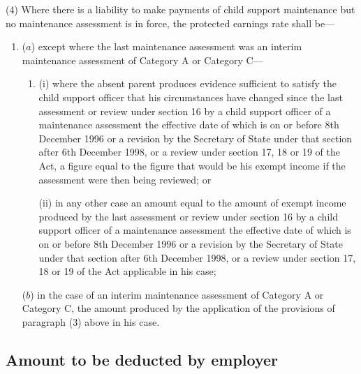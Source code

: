 \documentclass[12pt,a4paper]{article}
\begin{document}
(4) Where there is a liability to make payments of child support maintenance but no maintenance assessment is in force, the protected earnings rate shall be—
\begin{enumerate}\item[]
($a$) except where the last maintenance assessment was an interim maintenance assessment of Category A or Category C—
\begin{enumerate}\item[]
(i) where the absent parent produces evidence sufficient to satisfy the child support officer that his circumstances have changed since the last assessment or review under section 16
by a child support officer of a maintenance assessment the effective date of which is on or before 8th December 1996 or a revision by the Secretary of State under that section after 6th December 1998, or a review under section  %
17, 18 or 19 of the Act, a figure equal to the figure that would be his exempt income if the assessment were then being reviewed; or

(ii) in any other case an amount equal to the amount of exempt income produced by the last assessment or review under section 16
by a child support officer of a maintenance assessment the effective date of which is on or before 8th December 1996 or a revision by the Secretary of State under that section after 6th December 1998, or a review under section  %
17, 18 or 19 of the Act applicable in his case;
\end{enumerate}

($b$) in the case of an interim maintenance assessment of Category A or Category C, the amount produced by the application of the provisions of paragraph (3) above in his case.
\end{enumerate}


\subsection[12. Amount to be deducted by employer]{Amount to be deducted by employer}
\end{document}
